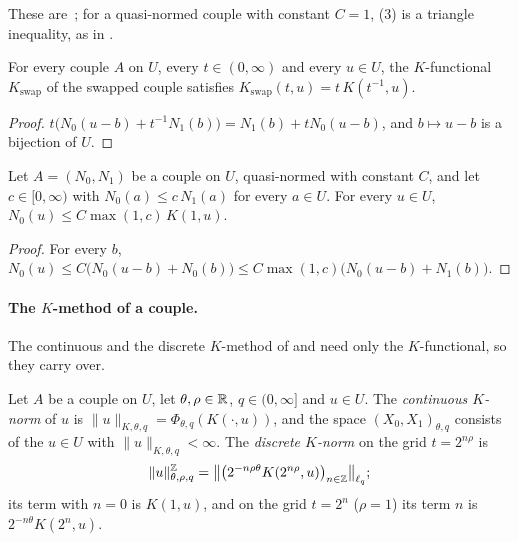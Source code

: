 These are~\cite[Lemmas~3.1.1 and~3.11.1]{BerghLofstrom}; for a quasi-normed couple with
constant $C = 1$, (3) is a triangle inequality, as in .

\begin{lemma}
\label{lem:couple-k-functional-swap}
\leanok
{}
For every couple $A$ on $U$, every $t \in (0, \infty)$ and every $u \in U$, the $K$-functional
$K_{\mathrm{swap}}$ of the swapped couple satisfies
$K_{\mathrm{swap}}(t, u) = t \, K(t^{-1}, u)$.
\end{lemma}

\begin{proof}
\leanok
$t \bigl(N_0(u - b) + t^{-1} N_1(b)\bigr) = N_1(b) + t N_0(u - b)$, and $b \mapsto u - b$ is a
bijection of $U$.
\end{proof}

\begin{lemma}
\label{lem:ordered-couple}
\leanok
{}
Let $A = (N_0, N_1)$ be a couple on $U$, quasi-normed with constant $C$, and let
$c \in [0, \infty)$ with $N_0(a) \leq c \, N_1(a)$ for every $a \in U$. For every $u \in U$,
$N_0(u) \leq C \max(1, c) \, K(1, u)$.
\end{lemma}

\begin{proof}
\leanok
For every $b$,
$N_0(u) \leq C \bigl(N_0(u - b) + N_0(b)\bigr) \leq C \max(1, c) \bigl(N_0(u - b) +
N_1(b)\bigr)$.
\end{proof}

\paragraph{The $K$-method of a couple.}
The continuous and the discrete $K$-method of  and
 need only the $K$-functional, so they carry over.

\begin{definition}
\label{def:couple-k-method}
\leanok
{}
Let $A$ be a couple on $U$, let $\theta, \rho \in \mathbb{R}$, $q \in (0, \infty]$ and $u \in U$. The
\emph{continuous $K$-norm} of $u$ is $\|u\|_{K, \theta, q} = \Phi_{\theta, q}(K(\cdot, u))$,
and the space $(X_0, X_1)_{\theta, q}$ consists of the $u \in U$ with
$\|u\|_{K, \theta, q} < \infty$. The \emph{discrete $K$-norm} on the grid $t = 2^{n\rho}$ is
\[
  \|u\|^{\mathbb{Z}}_{\theta, \rho, q}
  = \bigl\| \bigl(2^{-n\rho\theta} K(2^{n\rho}, u)\bigr)_{n \in \mathbb{Z}} \bigr\|_{\ell_q} ;
\]
its term with $n = 0$ is $K(1, u)$, and on the grid $t = 2^n$ ($\rho = 1$) its term $n$ is
$2^{-n\theta} K(2^n, u)$.
\end{definition}

